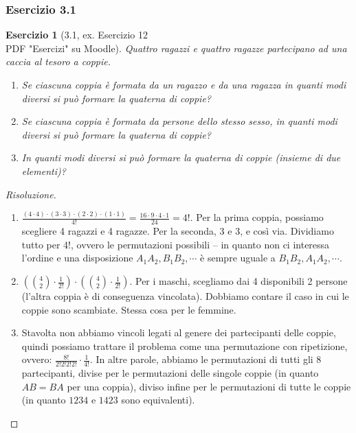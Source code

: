 \documentclass{beamer}
\newtheorem{exercise}{Esercizio}
\begin{document}
\begin{frame}[fragile]
	\frametitle{Esercizio 3.1}

	\begin{exercise}[3.1, ex. Esercizio 12\\PDF "Esercizi" su Moodle]
		Quattro ragazzi e quattro ragazze partecipano ad una caccia al tesoro a coppie.
		\begin{enumerate}
			\item Se ciascuna coppia è formata da un ragazzo e da una ragazza in quanti modi diversi si può formare la quaterna di coppie?
			\item Se ciascuna coppia è formata da persone dello stesso sesso, in quanti modi diversi si può formare la quaterna di coppie?
			\item In quanti modi diversi si può formare la quaterna di coppie (insieme di due elementi)?
		\end{enumerate}
	\end{exercise}
\end{frame}

\begin{frame}[fragile]
	\begin{proof}[Risoluzione]
		\begin{enumerate}
			\item $\frac{(4 \cdot 4) \cdot (3 \cdot 3) \cdot (2 \cdot 2) \cdot (1 \cdot 1)}{4!} = \frac{16 \cdot 9 \cdot 4 \cdot 1}{24} = 4!$. Per la prima coppia, possiamo scegliere 4 ragazzi e 4 ragazze. Per la seconda, 3 e 3, e così via. Dividiamo tutto per 4!, ovvero le permutazioni possibili -- in quanto non ci interessa l'ordine e una disposizione $A_1A_2, B_1B_2, \cdots$ è sempre uguale a $B_1B_2,  A_1A_2, \cdots$.
			\item $ (\binom{4}{2} \cdot \frac{1}{2!}) \cdot (\binom{4}{2} \cdot \frac{1}{2!})$. Per i maschi, scegliamo dai 4 disponibili 2 persone (l'altra coppia è di conseguenza vincolata). Dobbiamo contare il caso in cui le coppie sono scambiate. Stessa cosa per le femmine.
			\item Stavolta non abbiamo vincoli legati al genere dei partecipanti delle coppie, quindi possiamo trattare il problema come una permutazione con ripetizione, ovvero: $\frac{8!}{2!2!2!2!} \cdot \frac{1}{4!}$. In altre parole, abbiamo le permutazioni di tutti gli 8 partecipanti, divise per le permutazioni delle singole coppie (in quanto $AB = BA$ per una coppia), diviso infine per le permutazioni di tutte le coppie (in quanto $1234$ e $1423$ sono equivalenti). \qedhere
		\end{enumerate}
		\qedhere
	\end{proof}

\end{frame}
\end{document}
